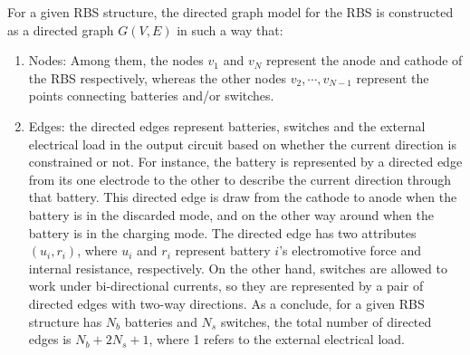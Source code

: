 \documentclass{article}
\begin{document}
For a given RBS structure, the directed graph model for the RBS is constructed as a directed graph $G(V,E)$ in such a way that:
\begin{enumerate}
    \item Nodes: %
        Among them, the nodes $v_1$ and $v_N$ represent the anode and cathode of the RBS respectively, whereas the other nodes $v_2,\cdots,v_{N-1}$ represent the points connecting batteries and/or switches.
    \item Edges: %
        the directed edges represent batteries, switches and the external electrical load in the output circuit based on whether the current direction is constrained or not. 
        For instance, the battery is represented by a directed edge from its one electrode to the other to describe the current direction through that battery.
        This directed edge is draw from the cathode to anode when the battery is in the discarded mode, and on the other way around when the battery is in the charging mode.
        The directed edge has two attributes $(u_i, r_i)$, where $u_i$ and $r_i$ represent battery $i$'s electromotive force and internal resistance, respectively.
        On the other hand, switches are allowed to work under bi-directional currents, so they are represented by a pair of directed edges with two-way directions.
        As a conclude, for a given RBS structure has $N_b$ batteries and $N_s$ switches, the total number of directed edges is $N_b+2N_s+1$, where 1 refers to the external electrical load. 

\end{enumerate}
\end{document}

